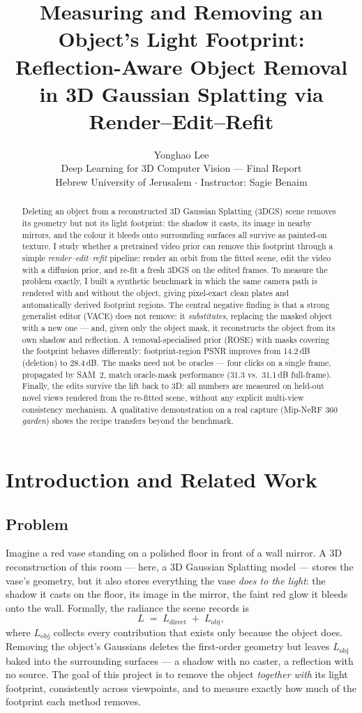 \documentclass[11pt]{article}
\title{Measuring and Removing an Object's Light Footprint:\\
\large Reflection-Aware Object Removal in 3D Gaussian Splatting via Render--Edit--Refit}
\author{Yonghao Lee\\[2pt]
{\normalsize Deep Learning for 3D Computer Vision --- Final Report}\\
{\normalsize Hebrew University of Jerusalem \quad $\cdot$ \quad Instructor: Sagie Benaim}}
\date{}
\begin{document}
\maketitle

\begin{abstract}
Deleting an object from a reconstructed 3D Gaussian Splatting (3DGS) scene removes its geometry but not its light footprint: the shadow it casts, its image in nearby mirrors, and the colour it bleeds onto surrounding surfaces all survive as painted-on texture. I study whether a pretrained video prior can remove this footprint through a simple \emph{render--edit--refit} pipeline: render an orbit from the fitted scene, edit the video with a diffusion prior, and re-fit a fresh 3DGS on the edited frames. To measure the problem exactly, I built a synthetic benchmark in which the same camera path is rendered with and without the object, giving pixel-exact clean plates and automatically derived footprint regions. The central negative finding is that a strong generalist editor (VACE) does not remove: it \emph{substitutes}, replacing the masked object with a new one --- and, given only the object mask, it reconstructs the object from its own shadow and reflection. A removal-specialised prior (ROSE) with masks covering the footprint behaves differently: footprint-region PSNR improves from 14.2\,dB (deletion) to 28.4\,dB. The masks need not be oracles --- four clicks on a single frame, propagated by SAM~2, match oracle-mask performance (31.3 vs.\ 31.1\,dB full-frame). Finally, the edits survive the lift back to 3D: all numbers are measured on held-out novel views rendered from the re-fitted scene, without any explicit multi-view consistency mechanism. A qualitative demonstration on a real capture (Mip-NeRF 360 \emph{garden}) shows the recipe transfers beyond the benchmark.
\end{abstract}

\section{Introduction and Related Work}
\label{sec:intro}

\subsection{Problem}
Imagine a red vase standing on a polished floor in front of a wall mirror. A 3D reconstruction of this room --- here, a 3D Gaussian Splatting model \cite{kerbl3dgs} --- stores the vase's geometry, but it also stores everything the vase \emph{does to the light}: the shadow it casts on the floor, its image in the mirror, the faint red glow it bleeds onto the wall. Formally, the radiance the scene records is
\[
L \;=\; L_{\mathrm{direct}} \;+\; L_{\mathrm{obj}},
\]
where $L_{\mathrm{obj}}$ collects every contribution that exists only because the object does. Removing the object's Gaussians deletes the first-order geometry but leaves $L_{\mathrm{obj}}$ baked into the surrounding surfaces --- a shadow with no caster, a reflection with no source. The goal of this project is to remove the object \emph{together with} its light footprint, consistently across viewpoints, and to measure exactly how much of the footprint each method removes.
\end{document}

